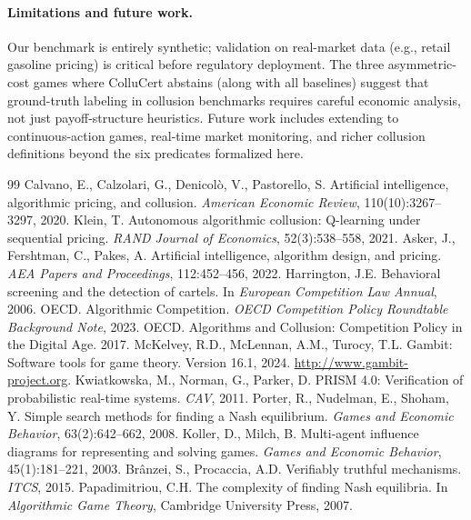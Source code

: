 \documentclass[11pt]{article}
\begin{document}
\paragraph{Limitations and future work.} Our benchmark is entirely synthetic; validation on real-market data (e.g., retail gasoline pricing) is critical before regulatory deployment. The three asymmetric-cost games where ColluCert abstains (along with all baselines) suggest that ground-truth labeling in collusion benchmarks requires careful economic analysis, not just payoff-structure heuristics. Future work includes extending to continuous-action games, real-time market monitoring, and richer collusion definitions beyond the six predicates formalized here.


\begin{thebibliography}{99}
 Calvano, E., Calzolari, G., Denicol\`{o}, V., Pastorello, S. Artificial intelligence, algorithmic pricing, and collusion. \emph{American Economic Review}, 110(10):3267--3297, 2020.
 Klein, T. Autonomous algorithmic collusion: Q-learning under sequential pricing. \emph{RAND Journal of Economics}, 52(3):538--558, 2021.
 Asker, J., Fershtman, C., Pakes, A. Artificial intelligence, algorithm design, and pricing. \emph{AEA Papers and Proceedings}, 112:452--456, 2022.
 Harrington, J.E. Behavioral screening and the detection of cartels. In \emph{European Competition Law Annual}, 2006.
 OECD. Algorithmic Competition. \emph{OECD Competition Policy Roundtable Background Note}, 2023.
 OECD. Algorithms and Collusion: Competition Policy in the Digital Age. 2017.
 McKelvey, R.D., McLennan, A.M., Turocy, T.L. Gambit: Software tools for game theory. Version 16.1, 2024. \url{http://www.gambit-project.org}.
 Kwiatkowska, M., Norman, G., Parker, D. PRISM 4.0: Verification of probabilistic real-time systems. \emph{CAV}, 2011.
 Porter, R., Nudelman, E., Shoham, Y. Simple search methods for finding a Nash equilibrium. \emph{Games and Economic Behavior}, 63(2):642--662, 2008.
 Koller, D., Milch, B. Multi-agent influence diagrams for representing and solving games. \emph{Games and Economic Behavior}, 45(1):181--221, 2003.
 Br\^{a}nzei, S., Procaccia, A.D. Verifiably truthful mechanisms. \emph{ITCS}, 2015.
 Papadimitriou, C.H. The complexity of finding Nash equilibria. In \emph{Algorithmic Game Theory}, Cambridge University Press, 2007.

\end{thebibliography}
\end{document}

